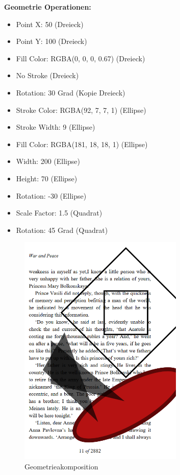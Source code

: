 \textbf{Geometrie Operationen:}
\begin{itemize}
	\item Point X: 50 (Dreieck)
	\item Point Y: 100 (Dreieck)
	\item Fill Color: RGBA(0, 0, 0, 0.67) (Dreieck)
	\item No Stroke (Dreieck)
	\item Rotation: 30 Grad (Kopie Dreieck)
	\item Stroke Color: RGBA(92, 7, 7, 1) (Ellipse) 
	\item Stroke Width: 9 (Ellipse)
	\item Fill Color: RGBA(181, 18, 18, 1) (Ellipse)
	\item Width: 200 (Ellipse)
	\item Height: 70 (Ellipse)
	\item Rotation: -30 (Ellipse)
	\item Scale Factor: 1.5 (Quadrat)
	\item Rotation: 45 Grad (Quadrat)
\end{itemize}

\begin{figure}[!htbp]
	\centering
	\includegraphics[width=0.7\textwidth]{"images/shape-ops.png"}
	\caption{Geometrieakomposition}
	\label{fig:shape-ops}
\end{figure}

